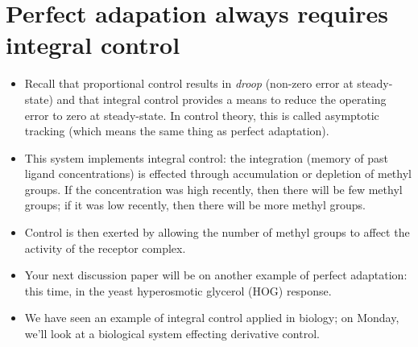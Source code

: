 \documentclass{article}
\begin{document}
\section*{Perfect adapation always requires integral control}

\begin{itemize}

\item Recall that proportional control results in \textit{droop} (non-zero error at steady-state) and that integral control provides a means to reduce the operating error to zero at steady-state. In control theory, this is called asymptotic tracking (which means the same thing as perfect adaptation).

\item This system implements integral control: the integration (memory of past ligand concentrations) is effected through accumulation or depletion of methyl groups. If the concentration was high recently, then there will be few methyl groups; if it was low recently, then there will be more methyl groups.

\item Control is then exerted by allowing the number of methyl groups to affect the activity of the receptor complex.

\item Your next discussion paper will be on another example of perfect adaptation: this time, in the yeast hyperosmotic glycerol (HOG) response.

\item We have seen an example of integral control applied in biology; on Monday, we'll look at a biological system effecting derivative control.

\end{itemize}
\end{document}

